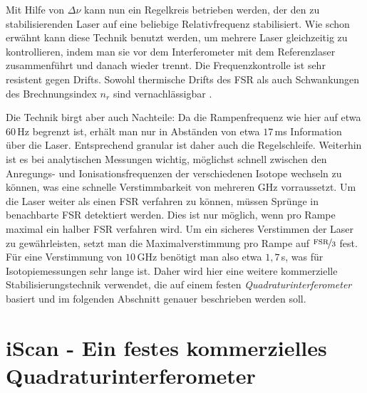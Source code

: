 Mit Hilfe von $\Delta\nu$ kann nun ein Regelkreis betrieben werden, der den zu
stabilisierenden Laser auf eine beliebige Relativfrequenz stabilisiert. Wie
schon erwähnt kann diese Technik benutzt werden, um mehrere Laser
gleichzeitig zu kontrollieren, indem man sie vor dem Interferometer mit dem
Referenzlaser zusammenführt und danach wieder trennt. Die Frequenzkontrolle
ist sehr resistent gegen Drifts. Sowohl thermische Drifts des FSR als auch
Schwankungen des Brechnungsindex $n_r$ sind vernachlässigbar
\cite{kuschnick:2000:diplomarbeit}.\par
Die Technik birgt aber auch Nachteile: Da die Rampenfrequenz wie hier auf etwa
$60\,$Hz begrenzt ist, erhält man nur in Abständen von etwa $17\,$ms
Information über die Laser. Entsprechend granular ist daher auch die
Regelschleife. Weiterhin ist es bei analytischen Messungen wichtig, möglichst
schnell zwischen den Anregungs- und Ionisationsfrequenzen der verschiedenen
Isotope wechseln zu können, was eine schnelle Verstimmbarkeit von mehreren GHz
vorraussetzt. Um die Laser weiter als einen FSR verfahren zu können, müssen
Sprünge in benachbarte FSR detektiert werden. Dies ist nur möglich, wenn pro Rampe maximal ein halber FSR verfahren wird. Um ein sicheres
Verstimmen der Laser zu gewährleisten, setzt man die Maximalverstimmung pro
Rampe auf $\nicefrac{\text{FSR}}{3}$ fest. Für eine Verstimmung von $10\,$GHz benötigt
man also etwa $1,7\,$s, was für Isotopiemessungen sehr lange ist. Daher wird
hier eine weitere kommerzielle Stabilisierungstechnik verwendet, die auf einem festen
\textit{Quadraturinterferometer} basiert und im folgenden Abschnitt genauer
beschrieben werden soll.

\section{iScan - Ein festes kommerzielles
Quadraturinterferometer}\label{sec:iScan}

